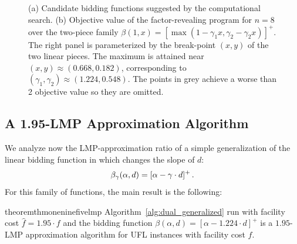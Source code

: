 \begin{figure}[H]
\centering
\begin{subfigure}{.465\textwidth}
  \centering
  \raisebox{0.0in}{}
  \caption{}
  \label{fig:sub1}
\end{subfigure}%
\begin{subfigure}{.535\textwidth}
  \centering
  \raisebox{0in}{}
  \caption{}
  \label{fig:sub2}
\end{subfigure}
\caption{(a) Candidate bidding functions suggested by the computational search. (b) Objective value of the factor-revealing program for $n=8$ over the two-piece family $\beta(1,x)=[\max(1 - \gamma_1 x, \gamma_2 - \gamma_2 x)]^+$. The right panel is parameterized by the break-point $(x, y)$ of the two linear pieces.
The maximum is attained near $(x,y)\approx(0.668,0.182)$, corresponding to $(\gamma_1,\gamma_2) \approx (1.224,0.548)$. The points in grey achieve a worse than 2 objective value so they are omitted.}

\label{fig:test}
\end{figure}

\subsection{A 1.95-LMP Approximation Algorithm}\label{sec:informal-proof-thm-195}

We analyze now the LMP-approximation ratio of a simple generalization of the linear bidding function in \cite{JMS02,JainMMSV03} which changes the slope of $d$:
\begin{equation*}    
    \beta_{\gamma}(\alpha, d) = [\alpha - \gamma \cdot d]^+\,.
\end{equation*}
For this family of functions, the main result is the following:
\begin{restatable}{theorem}{thmoneninefivelmp}\label{thm:1.95-lmp}
    Algorithm~\ref{alg:dual_generalized} run with facility cost $\hat{f} = 1.95 \cdot f$ and the bidding function $\beta(\alpha,d) = [\alpha - 1.224\cdot d]^{+}$ is a $1.95$-LMP approximation algorithm for UFL instances with facility cost $f$.
\end{restatable}

